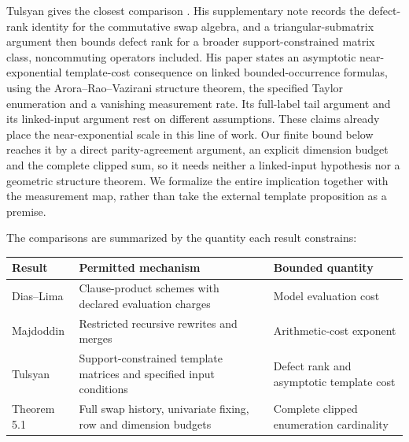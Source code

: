 \documentclass[11pt,letterpaper]{article}
\begin{document}
Tulsyan gives the closest comparison \citetext{\citealp[Section
5]{T26}; \citealp[Sections 1--3]{T26note}}. His supplementary note
records the defect-rank identity for the commutative swap algebra, and a
triangular-submatrix argument then bounds defect rank for a broader
support-constrained matrix class, noncommuting operators included. His
paper states an asymptotic near-exponential template-cost consequence on
linked bounded-occurrence formulas, using the Arora--Rao--Vazirani
structure theorem, the specified Taylor enumeration and a vanishing
measurement rate. Its full-label tail argument and its linked-input
argument rest on different assumptions. These claims already place the
near-exponential scale in this line of work. Our finite bound below
reaches it by a direct parity-agreement argument, an explicit dimension
budget and the complete clipped sum, so it needs neither a linked-input
hypothesis nor a geometric structure theorem. We formalize the entire
implication together with the measurement map, rather than take the
external template proposition as a premise.

The comparisons are summarized by the quantity each result constrains:

{\def\LTcaptype{none} %
\begin{longtable}[]{@{}
  >{\raggedright\arraybackslash}p{}
  >{\raggedright\arraybackslash}p{}
  >{\raggedright\arraybackslash}p{}@{}}
\toprule\noalign{}
\begin{minipage}[b]{\linewidth}\raggedright
Result
\end{minipage} & \begin{minipage}[b]{\linewidth}\raggedright
Permitted mechanism
\end{minipage} & \begin{minipage}[b]{\linewidth}\raggedright
Bounded quantity
\end{minipage} \\
\midrule\noalign{}
\endhead
\bottomrule\noalign{}
\endlastfoot
Dias--Lima & Clause-product schemes with declared evaluation charges &
Model evaluation cost \\
Majdoddin & Restricted recursive rewrites and merges & Arithmetic-cost
exponent \\
Tulsyan & Support-constrained template matrices and specified input
conditions & Defect rank and asymptotic template cost \\
Theorem 5.1 & Full swap history, univariate fixing, row and dimension
budgets & Complete clipped enumeration cardinality \\
\end{longtable}
}
\end{document}
